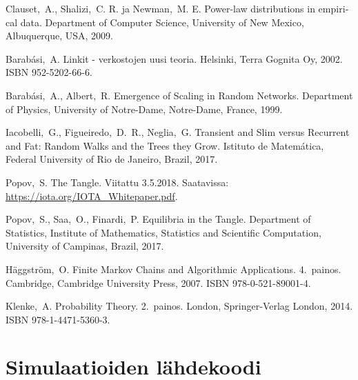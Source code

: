 \documentclass[finnish, 12pt, a4paper, sci, utf8, pdfa]{aaltothesis}
\begin{document}
\clearpage

\thesisbibliography

\begin{thebibliography}{99}

 Clauset,\ A., Shalizi,\ C. R. ja Newman,\ M. E. 
   \foreignlanguage{english}{Power-law distributions in empirical data.} 
   Department of Computer Science, University of New Mexico, Albuquerque, USA, 2009.

 Barabási,\ A. Linkit - verkostojen uusi teoria. 
   Helsinki, Terra Gognita Oy, 2002. ISBN 952-5202-66-6. 

 Barabási,\ A., Albert,\ R.
   \foreignlanguage{english}{Emergence of Scaling in Random Networks.} 
   Department of Physics, University of Notre-Dame, Notre-Dame, France, 1999.

 Iacobelli,\ G., Figueiredo,\ D.\ R., Neglia,\ G. 
   \foreignlanguage{english}{Transient and Slim versus Recurrent and Fat: Random Walks and the Trees they Grow.} 
   Istituto de Matemática, Federal University of Rio de Janeiro, Brazil, 2017.

 Popov,\ S. The Tangle. Viitattu 3.5.2018. Saatavissa: \url{https://iota.org/IOTA_Whitepaper.pdf}.

 Popov,\ S., Saa,\ O., Finardi,\ P. 
   \foreignlanguage{english}{Equilibria in the Tangle.} 
   Department of Statistics, Institute of Mathematics, Statistics and Scientific Computation, University of Campinas, Brazil, 2017.

 Häggström,\ O.
   \foreignlanguage{english}{Finite Markov Chains and Algorithmic Applications.} 
   4.\ painos. Cambridge, Cambridge University Press, 2007. ISBN 978-0-521-89001-4.

 Klenke,\ A.
   \foreignlanguage{english}{Probability Theory.}
   2.\ painos. London, Springer-Verlag London, 2014. ISBN 978-1-4471-5360-3.

\end{thebibliography}

\clearpage

\thesisappendix

\section{Simulaatioiden lähdekoodi\label{LiiteA}}
\end{document}
